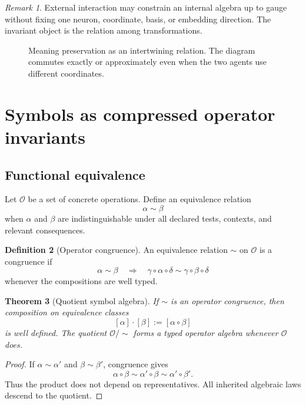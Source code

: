 \documentclass[11pt]{article}
\newtheorem{theorem}{Theorem}[section]
\theoremstyle{definition}
\newtheorem{definition}[theorem]{Definition}
\theoremstyle{remark}
\newtheorem{remark}[theorem]{Remark}
\newcommand{\Lat}{\mathcal H}
\begin{document}
\begin{remark}
External interaction may constrain an internal algebra up to gauge without fixing one neuron, coordinate, basis, or embedding direction. The invariant object is the relation among transformations.
\end{remark}

\begin{figure}[ht]
\centering
{}
\caption{Meaning preservation as an intertwining relation. The diagram commutes exactly or approximately even when the two agents use different coordinates.}
\label{fig:intertwiner}
\end{figure}

\section{Symbols as compressed operator invariants}

\subsection{Functional equivalence}

Let \(\mathcal O\) be a set of concrete operations. Define an equivalence relation
\[
\alpha\sim\beta
\]
when \(\alpha\) and \(\beta\) are indistinguishable under all declared tests, contexts, and relevant consequences.

\begin{definition}[Operator congruence]
An equivalence relation \(\sim\) on \(\mathcal O\) is a congruence if
\[
\alpha\sim\beta
\quad\Longrightarrow\quad
\gamma\circ\alpha\circ\delta
\sim
\gamma\circ\beta\circ\delta
\]
whenever the compositions are well typed.
\end{definition}

\begin{theorem}[Quotient symbol algebra]
If \(\sim\) is an operator congruence, then composition on equivalence classes
\[
[\alpha]\cdot[\beta]
:=
[\alpha\circ\beta]
\]
is well defined. The quotient \(\mathcal O/{\sim}\) forms a typed operator algebra whenever \(\mathcal O\) does.
\end{theorem}

\begin{proof}
If \(\alpha\sim\alpha'\) and \(\beta\sim\beta'\), congruence gives
\[
\alpha\circ\beta
\sim
\alpha'\circ\beta
\sim
\alpha'\circ\beta'.
\]
Thus the product does not depend on representatives. All inherited algebraic laws descend to the quotient.
\end{proof}
\end{document}
